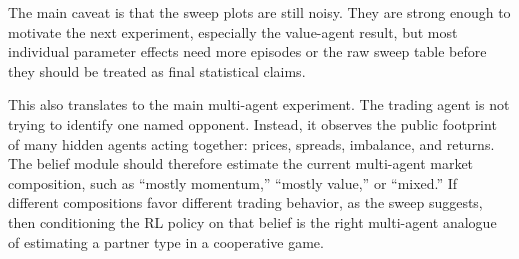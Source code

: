 \documentclass[11pt]{article}
\begin{document}
The main caveat is that the sweep plots are still noisy. They are strong enough
to motivate the next experiment, especially the value-agent result, but most
individual parameter effects need more episodes or the raw sweep table before
they should be treated as final statistical claims.

This also translates to the main multi-agent experiment. The trading agent is
not trying to identify one named opponent. Instead, it observes the public
footprint of many hidden agents acting together: prices, spreads, imbalance,
and returns. The belief module should therefore estimate the current
multi-agent market composition, such as ``mostly momentum,'' ``mostly value,''
or ``mixed.'' If different compositions favor different trading behavior, as
the sweep suggests, then conditioning the RL policy on that belief is the right
multi-agent analogue of estimating a partner type in a cooperative game.
\end{document}
